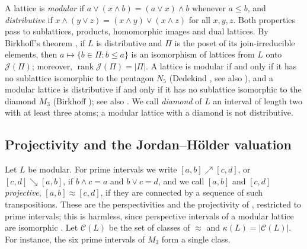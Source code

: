 \documentclass{amsart}
\theoremstyle{definition}
\DeclareMathOperator{\rk}{rank}
\newcommand{\cC}{\mathcal C}
\begin{document}
A lattice is \emph{modular} if $a\vee(x\wedge b)=(a\vee x)\wedge b$ whenever $a\le b$, and \emph{distributive} if $x\wedge(y\vee z)=(x\wedge y)\vee(x\wedge z)$ for all $x,y,z$. Both properties pass to sublattices, products, homomorphic images and dual lattices. By Birkhoff's theorem \cite[Theorem~9.1.7]{HH11}, if $L$ is distributive and $\Pi$ is the poset of its join-irreducible elements, then $a\mapsto\{b\in\Pi:b\le a\}$ is an isomorphism of lattices from $L$ onto $\mathcal J(\Pi)$; moreover, $\rk\mathcal J(\Pi)=|\Pi|$. A lattice is modular if and only if it has no sublattice isomorphic to the pentagon $N_5$ (Dedekind \cite{De}, see also \cite[pp.~65--66]{B}), and a modular lattice is distributive if and only if it has no sublattice isomorphic to the diamond $M_3$ (Birkhoff \cite[p.~152]{B}); see also \cite[Theorem 6.10]{HHO}. We call \emph{diamond} of $L$ an interval of length two with at least three atoms; a modular lattice with a diamond is not distributive.



\subsection{Projectivity and the Jordan--H\"older valuation}
Let $L$ be modular. For prime intervals we write $[a,b]\nearrow[c,d]$, or $[c,d]\searrow[a,b]$, if $b\wedge c=a$ and $b\vee c=d$, and we call $[a,b]$ and $[c,d]$ \emph{projective}, $[a,b]\approx[c,d]$, if they are connected by a sequence of such transpositions. These are the perspectivities and the projectivity of \cite[Section I.3.5]{G}, restricted to prime intervals; this is harmless, since perspective intervals of a modular lattice are isomorphic \cite[Theorem 348]{G}. Let $\cC(L)$ be the set of classes of $\approx$ and $\kappa(L)=|\cC(L)|$. For instance, the six prime intervals of $M_3$ form a single class.
\end{document}
